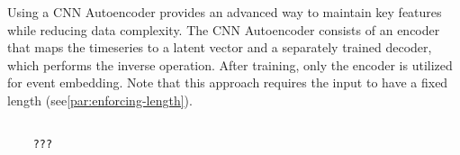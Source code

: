 Using a \ac{CNN} Autoencoder provides an advanced way to maintain key features while reducing data complexity. The CNN Autoencoder consists of an encoder that maps the timeseries to a latent vector and a separately trained decoder, which performs the inverse operation. After training, only the encoder is utilized for event embedding. Note that this approach requires the input to have a fixed length (see\ref{par:enforcing-length}).

\begin{lstlisting}[style=pyStyle]

    ???

\end{lstlisting}



%
%
%
%
%
%
%
%


